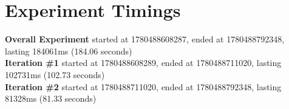 \documentclass{article}
\begin{document}
\section*{Experiment Timings}
\textbf{Overall Experiment} started at 1780488608287, ended at 1780488792348, lasting 184061ms (184.06 seconds)
\\\textbf{Iteration \#1} started at 1780488608289, ended at 1780488711020, lasting 102731ms (102.73 seconds)
\\\textbf{Iteration \#2} started at 1780488711020, ended at 1780488792348, lasting 81328ms (81.33 seconds)
\end{document}
